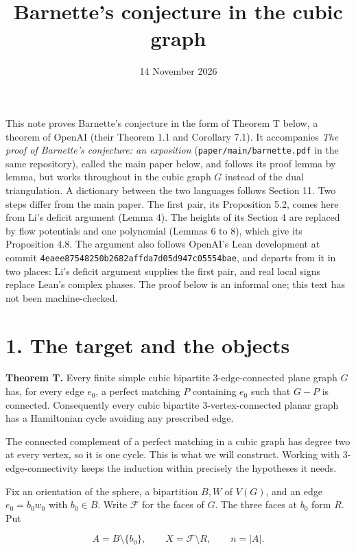 \documentclass[a4paper,11pt]{amsart}
\title{Barnette's conjecture in the cubic graph}
\author{}
\date{14 November 2026}
\begin{document}
\maketitle

This note proves Barnette's conjecture in the form of Theorem T below, a theorem of OpenAI (their Theorem 1.1 and Corollary 7.1). It accompanies \emph{The proof of Barnette's conjecture: an exposition} (\nolinkurl{paper/main/barnette.pdf} in the same repository), called the main paper below, and follows its proof lemma by lemma, but works throughout in the cubic graph $G$ instead of the dual triangulation. A dictionary between the two languages follows Section 11. Two steps differ from the main paper. The first pair, its Proposition 5.2, comes here from Li's deficit argument (Lemma 4). The heights of its Section 4 are replaced by flow potentials and one polynomial (Lemmas 6 to 8), which give its Proposition 4.8. The argument also follows OpenAI's Lean development at commit \nolinkurl{4eaee87548250b2682affda7d05d947c05554bae}, and departs from it in two places: Li's deficit argument supplies the first pair, and real local signs replace Lean's complex phases. The proof below is an informal one; this text has not been machine-checked.

\section*{1. The target and the objects}

\textbf{Theorem T.} Every finite simple cubic bipartite 3-edge-connected plane graph $G$ has, for every edge $e_0$, a perfect matching $P$ containing $e_0$ such that $G-P$ is connected. Consequently every cubic bipartite 3-vertex-connected planar graph has a Hamiltonian cycle avoiding any prescribed edge.

The connected complement of a perfect matching in a cubic graph has degree two at every vertex, so it is one cycle. This is what we will construct. Working with 3-edge-connectivity keeps the induction within precisely the hypotheses it needs.

Fix an orientation of the sphere, a bipartition $B,\allowbreak W$ of $V(G)$, and an edge $e_0=b_0w_0$ with $b_0\in B$. Write $\mathcal F$ for the faces of $G$. The three faces at $b_0$ form $R$. Put

\begin{equation*}
A=B\setminus\{b_0\},\qquad X=\mathcal F\setminus R,\qquad n=|A|.
\end{equation*}
\end{document}

